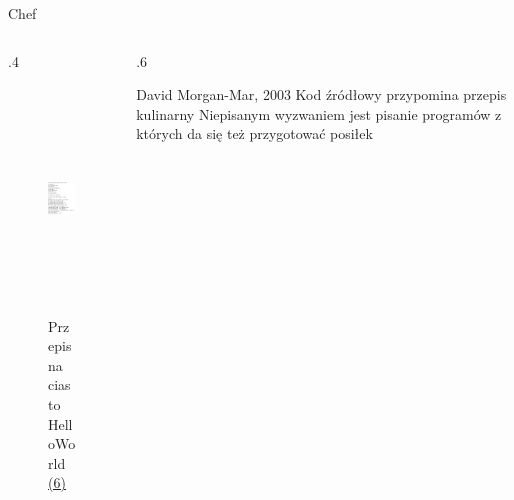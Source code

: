 \begin{frame}{Chef}

    \begin{columns}

		\begin{column}{.4\hsize}
			\begin{figure}
				\includegraphics[height=6cm]{figures/chef1.png}
				\caption*{\footnotesize Przepis na ciasto HelloWorld {\color{blue} \hyperlink{frame:przypisy}{(6)}}}
			\end{figure}
		\end{column}

		\begin{column}{.6\hsize}
            \hspace{0.5cm}
			\begin{itemize}
				\myitem David Morgan-Mar, 2003
				\myitem Kod źródłowy przypomina przepis kulinarny
				\myitem Niepisanym wyzwaniem jest pisanie programów z których da się też przygotować posiłek
			\end{itemize}
		\end{column}

	\end{columns}

\end{frame}
